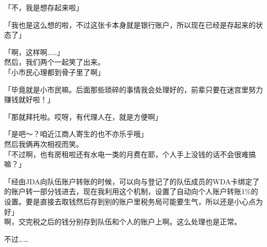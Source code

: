 「不，我是想存起来啦」

「我也是这么想的啦，不过这张卡本身就是银行账户，所以现在已经是存起来的状态了」

「啊，这样啊……」\\

然后，我们两个一起笑了出来。\\

「小市民心理都到骨子里了啊」

「毕竟就是小市民嘛。后面那些琐碎的事情我会处理好的，前辈只要在迷宫里努力赚钱就好啦！」

「那就拜托啦。哎呀，有代理人在，就是方便啊」

「是吧～？咱近江商人寄生的也不亦乐乎哦」\\

然后我俩再次相视而笑。\\

「不过啊，也有房租啦还有水电一类的月费在耶，个人手上没钱的话不会很难搞嘛？」

「经由JDA向队伍账户转账的时候，可以向与登记了的队伍成员的WDA卡绑定了的账户转一部分钱进去，现在我利用这个机制，设置了自动向个人账户转账1\%的设置。要是直接去取钱然后存到别的账户里税务局可能要生气，所以还是小心点为好」\\

啊，交完税之后的钱分别存到队伍和个人的账户上啊。这么处理也是正常。

不过……\\

